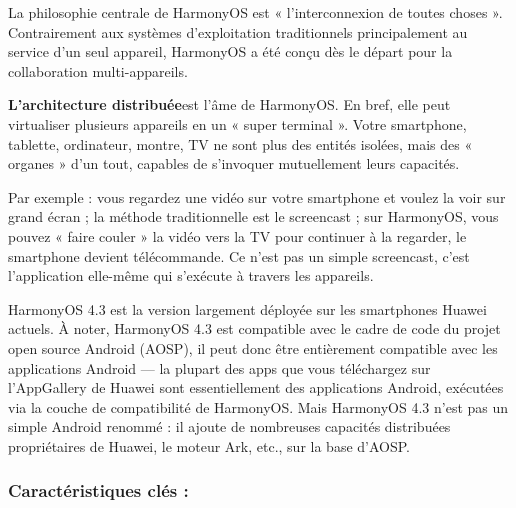 


La philosophie centrale de HarmonyOS est « l'interconnexion de toutes choses ». Contrairement aux systèmes d'exploitation traditionnels principalement au service d'un seul appareil, HarmonyOS a été conçu dès le départ pour la collaboration multi-appareils.

\textbf{L'architecture distribuée}est l'âme de HarmonyOS. En bref, elle peut virtualiser plusieurs appareils en un « super terminal ». Votre smartphone, tablette, ordinateur, montre, TV ne sont plus des entités isolées, mais des « organes » d'un tout, capables de s'invoquer mutuellement leurs capacités.

Par exemple : vous regardez une vidéo sur votre smartphone et voulez la voir sur grand écran ; la méthode traditionnelle est le screencast ; sur HarmonyOS, vous pouvez « faire couler » la vidéo vers la TV pour continuer à la regarder, le smartphone devient télécommande. Ce n'est pas un simple screencast, c'est l'application elle-même qui s'exécute à travers les appareils.


HarmonyOS 4.3 est la version largement déployée sur les smartphones Huawei actuels. À noter, HarmonyOS 4.3 est compatible avec le cadre de code du projet open source Android (AOSP), il peut donc être entièrement compatible avec les applications Android — la plupart des apps que vous téléchargez sur l'AppGallery de Huawei sont essentiellement des applications Android, exécutées via la couche de compatibilité de HarmonyOS. Mais HarmonyOS 4.3 n'est pas un simple Android renommé : il ajoute de nombreuses capacités distribuées propriétaires de Huawei, le moteur Ark, etc., sur la base d'AOSP.

\subsubsection*{Caractéristiques clés :}

